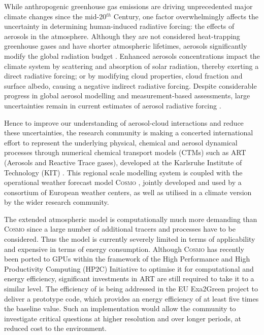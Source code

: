 While anthropogenic greenhouse gas emissions are driving unprecedented
major  climate changes  since  the mid-20$^{th}$  Century, one  factor
overwhelmingly  affects the  uncertainty in  determining human-induced
radiative  forcing:  the  effects   of  aerosols  in  the  atmosphere.
Although they  are not  considered heat-trapping greenhouse  gases and
have shorter atmospheric  lifetimes, aerosols significantly modify the
global   radiation   budget   \cite{IPCC-2013}.    Enhanced   aerosols
concentrations impact the climate  system by scattering and absorption
of solar radiation, thereby exerting a direct radiative forcing; or by
modifying cloud properties, cloud fraction and surface albedo, causing
a negative indirect  radiative forcing.  Despite considerable progress
in  global aerosol  modelling  \cite{Mann-2013} and  measurement-based
assessments,  large  uncertainties  remain  in  current  estimates  of
aerosol  radiative   forcing  \cite{Myhre-2013,  IPCC-2013,  Lee-2013,
Sherwood-2013, Stier-2013}.

Hence to  improve our understanding of  aerosol-cloud interactions and
reduce  these  uncertainties,  the  research  community  is  making  a
concerted international  effort to represent  the underlying physical,
chemical  and aerosol dynamical  processes through  numerical chemical
transport  models (CTMs)  such  as ART  (Aerosols  and Reactive  Trace
gases),   developed   at  the   Karlsruhe   Institute  of   Technology
(KIT)  \cite{Vogel-2009,  Bangert-2011,  Knote-2013}.   This  regional
scale  modelling  system  is  coupled  with  the  operational  weather
forecast  model \textsc{Cosmo} \cite{Baldauf-2011},  jointly developed
and  used by  a consortium  of European  weather centers,  as  well as
utilised in a climate version by the wider research community.

The extended  atmospheric model \cosmoart  is com\-put\-ationally much
more demanding than \textsc{Cosmo}  since a large number of additional
tracers  and processes  have  to  be considered.   Thus  the model  is
currently severely limited in  terms of applicability and expensive in
terms  of energy  consumption.  Although  \textsc{Cosmo}  has recently
been  ported  to  GPUs  \cite{Gysi-2014, Lapillonne-2014}  within  the
framework  of the  High  Performance and  High Productivity  Computing
(HP2C)  Initiative \cite{HP2C}  to optimise  it for  computational and
energy efficiency,  significant investments in ART  are still required
to take it  to a similar level.  The efficiency  of \cosmoart is being
addressed in  the EU Exa2Green  project \cite{EXA2GREEN} to  deliver a
prototype code, which  provides an energy efficiency of  at least five
times  the baseline  value.  Such  an implementation  would  allow the
community to  investigate critical questions at  higher resolution and
over longer periods, at reduced cost to the environment.


